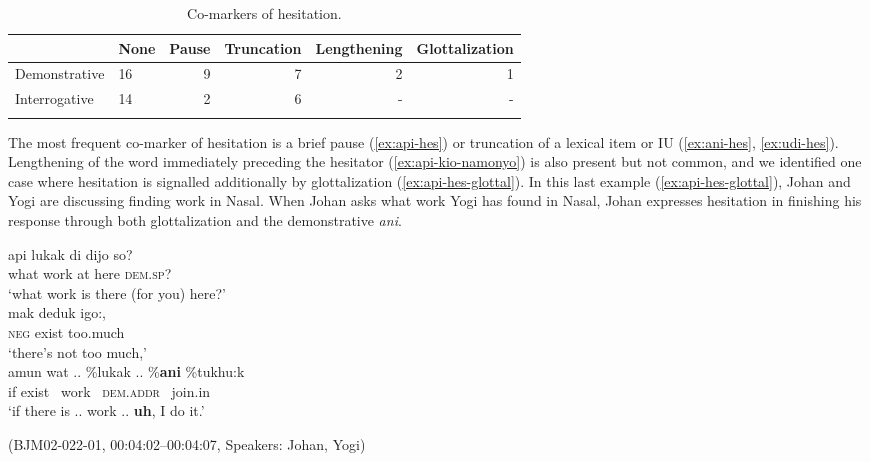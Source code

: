 \documentclass[output=paper,colorlinks,citecolor=brown
\ChapterDOI{10.5281/zenodo.15697585}
]{langscibook}
\begin{document}
\begin{table}[h]
    \caption{Co-markers of hesitation.}
    \label{tab:billings:non-lex-hes}
    \begin{tabularx}{\textwidth}{l Yrrrr}
        \lsptoprule
        & {None} & {Pause} & {Truncation} & {Lengthening} & {Glottalization} \\
        \midrule
        Demonstrative & 16 & 9 & 7 & 2 & 1 \\
        Interrogative & 14 & 2 & 6 & - & - \\
        \lspbottomrule
    \end{tabularx}
\end{table}

The most frequent co-marker of hesitation is a brief pause (\ref{ex:api-hes}) or truncation of a lexical item or IU (\ref{ex:ani-hes}, \ref{ex:udi-hes}). Lengthening of the word immediately preceding the hesitator (\ref{ex:api-kio-namonyo}) is also present but not common, and we identified one case where hesitation is signalled additionally by glottalization (\ref{ex:api-hes-glottal}). In this last example (\ref{ex:api-hes-glottal}), Johan and Yogi are discussing finding work in Nasal. When Johan asks what work Yogi has found in Nasal, Johan expresses hesitation in finishing his response through both glottalization and the demonstrative \textit{ani}.

\begin{exe}
    \ex\label{ex:api-hes-glottal} \begin{xlist}[0\quad →A:]
         \gll
        api lukak di dijo so? \\
        what work at here \textsc{dem.sp}? \\
        \glt `what work is there (for you) here?' \\
         \gll
        mak deduk igo:, \\
        \textsc{neg} exist too.much \\
        \glt `there's not too much,' \\
         \gll
        amun wat .. \%lukak .. \%\textbf{ani} \%tukhu:k \\
        if exist {} {\  }work {} {\  }\textsc{dem.addr} {\  }join.in \\
        \glt `if there is .. work .. \textbf{uh}, I do it.' \\
    \end{xlist}
    \hfill (BJM02-022-01, 00:04:02–00:04:07, Speakers: Johan, Yogi) 
\end{exe}
\end{document}
